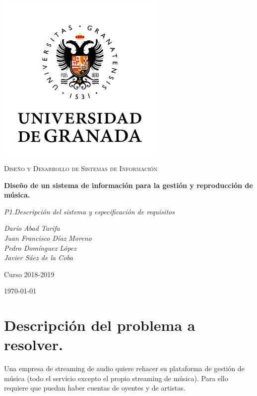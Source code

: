 \documentclass[12pt,a4paper]{article}
\begin{document}
\begin{titlepage}
  \centering
  \includegraphics[width=0.6\textwidth]{imagenes/ugr.png}\par\vspace{1cm}
  {\scshape\large Diseño y Desarrollo de Sistemas de Información \par} \vspace{1cm}
  {\huge\bfseries Diseño de un sistema de información para la gestión y reproducción de música. \par}
  \vspace{0.4cm}
  {\large\itshape P1.Descripción del sistema y especificación de requisitos\\}
  \vspace{0.6cm}
  {\large\itshape  Darío Abad Tarifa \\ Juan Francisco Díaz Moreno \\ Pedro Domínguez López \\ Javier Sáez de la Coba \par} \vspace{1.00cm}
  Curso 2018-2019 \\
  \vfill

  {\large \today\par}
\end{titlepage}

\tableofcontents
\newpage

\setlength{\parskip}{10pt}

\section{Descripción del problema a resolver.}

Una empresa de streaming de audio quiere rehacer su plataforma de gestión de música (todo el servicio excepto el propio streaming de música). Para ello requiere que puedan haber cuentas de oyentes y de artistas.
\end{document}
